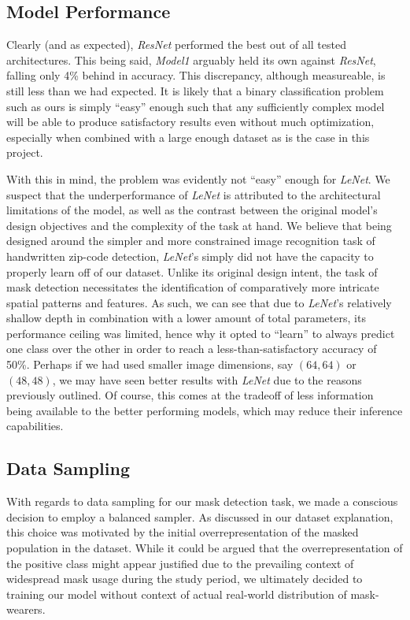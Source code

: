 \documentclass{article}
\begin{document}
\subsection{Model Performance}

Clearly (and as expected), \textit{ResNet} performed the best out of all tested architectures. This being said, \textit{Model1} arguably held its own against \textit{ResNet}, falling only 4\% behind in accuracy. This discrepancy, although measureable, is still less than we had expected. It is likely that a binary classification problem such as ours is simply \enquote{easy} enough such that any sufficiently complex model will be able to produce satisfactory results even without much optimization, especially when combined with a large enough dataset as is the case in this project.

With this in mind, the problem was evidently not \enquote{easy} enough for \textit{LeNet}. We suspect that the underperformance of \textit{LeNet} is attributed to the architectural limitations of the model, as well as the contrast between the original model's design objectives and the complexity of the task at hand. We believe that being designed around the simpler and more constrained image recognition task of handwritten zip-code detection, \textit{LeNet}'s simply did not have the capacity to properly learn off of our dataset. Unlike its original design intent, the task of mask detection necessitates the identification of comparatively more intricate spatial patterns and features. As such, we can see that due to \textit{LeNet}'s relatively shallow depth in combination with a lower amount of total parameters, its performance ceiling was limited, hence why it opted to \enquote{learn} to always predict  one class over the other in order to reach a less-than-satisfactory accuracy of 50\%. Perhaps if we had used smaller image dimensions, say $(64,64)$ or $(48,48)$, we may have seen better results with \textit{LeNet} due to the reasons previously outlined. Of course, this comes at the tradeoff of less information being available to the better performing models, which may reduce their inference capabilities.

\subsection{Data Sampling}

With regards to data sampling for our mask detection task, we made a conscious decision to employ a balanced sampler. As discussed in our dataset explanation, this choice was motivated by the initial overrepresentation of the masked population in the dataset. While it could be argued that the overrepresentation of the positive class might appear justified due to the prevailing context of widespread mask usage during the study period, we ultimately decided to training our model without context of actual real-world distribution of mask-wearers.
\end{document}
